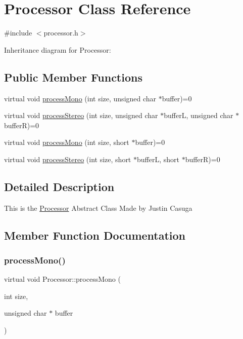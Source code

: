 \hypertarget{classProcessor}{}\section{Processor Class Reference}
\label{classProcessor}


{\ttfamily \#include $<$processor.\+h$>$}



Inheritance diagram for Processor\+:
\subsection*{Public Member Functions}
\begin{DoxyCompactItemize}
\item 
virtual void \hyperlink{classProcessor_aae6af1473510f56839f3e15328962fb0}{process\+Mono} (int size, unsigned char $\ast$buffer)=0
\item 
virtual void \hyperlink{classProcessor_a9b3db1d1810308706285c3ffd1f6d28c}{process\+Stereo} (int size, unsigned char $\ast$bufferL, unsigned char $\ast$bufferR)=0
\item 
virtual void \hyperlink{classProcessor_ab24fa87b5eb6246cf8599756b3b5862d}{process\+Mono} (int size, short $\ast$buffer)=0
\item 
virtual void \hyperlink{classProcessor_a705ddc9aa4c2400a30691fc9888c8e9e}{process\+Stereo} (int size, short $\ast$bufferL, short $\ast$bufferR)=0
\end{DoxyCompactItemize}


\subsection{Detailed Description}
This is the \hyperlink{classProcessor}{Processor} Abstract Class Made by Justin Casuga 

\subsection{Member Function Documentation}
\mbox{\label{classProcessor_aae6af1473510f56839f3e15328962fb0}} 
\subsubsection{\texorpdfstring{process\+Mono()}{processMono()}\hspace{0.1cm}{\footnotesize\ttfamily [1/2]}}
{\footnotesize\ttfamily virtual void Processor\+::process\+Mono (\begin{DoxyParamCaption}\item[{int}]{size,  }\item[{unsigned char $\ast$}]{buffer }\end{DoxyParamCaption})\hspace{0.3cm}{\ttfamily [pure virtual]}}


